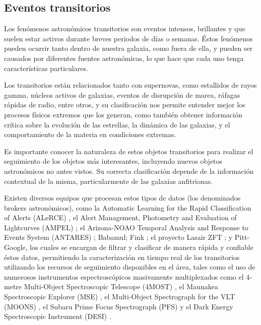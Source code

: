 \documentclass[../tesis.tex]{subfiles}
\begin{document}
\subsection{Eventos transitorios}

Los fenómenos astronómicos transitorios son eventos intensos, brillantes y que suelen estar activos durante breves periodos de días o semanas. Éstos fenómenos pueden ocurrir tanto dentro de nuestra galaxia, como fuera de ella, y pueden ser causados por diferentes fuentes astronómicas, lo que hace que cada uno tenga características particulares.\par\null\par 

Los transitorios están relacionados tanto con supernovas, como estallidos de rayos gamma, núcleos activos de galaxias, eventos de disrupción de marea, ráfagas rápidas de radio, entre otros, y su clasificación nos permite entender mejor los procesos físicos extremos que los generan, como también obtener información crítica sobre la evolución de las estrellas, la dinámica de las galaxias, y el comportamiento de la materia en condiciones extremas.\par\null\par

Es importante conocer la naturaleza de estos objetos transitorios para realizar el seguimiento de los objetos más interesantes, incluyendo nuevos objetos astronómicos no antes vistos. Su correcta clasificación depende de la información contextual de la misma, particularmente de las galaxias anfitrionas.\par\null\par

Existen diversos equipos que procesan estos tipos de datos (los denominados brokers astronómicos), como la Automatic Learning for the Rapid Classification of Alerts (ALeRCE) \cite{alerce}, el Alert Management, Photometry and Evaluation of Lightcurves (AMPEL) \cite{ampel}; el Arizona-NOAO Temporal Analysis and Response to Events System (ANTARES) \cite{antares}; Babamul; Fink \cite{fink}; el proyecto Lasair ZFT \cite{lasair}; y Pitt-Google, los cuales se encargan de filtrar y clasificar de manera rápida y confiable éstos datos, permitiendo la caracterización en tiempo real de los transitorios utilizando los recursos de seguimiento disponibles en el área, tales como el uso de numerosos instrumentos espectroscópicos masivamente multiplexados como el 4-metre Multi-Object Spectroscopic Telescope (4MOST) \cite{4most}, el Maunakea Spectroscopic Explorer (MSE) \cite{mse}, el Multi-Object Spectrograph for the VLT (MOONS) \cite{MOONS}, el Subaru Prime Focus Spectrograph (PFS) \cite{pfs} y el Dark Energy Spectroscopic Instrument (DESI) \cite{desi}.\par\null\par
\end{document}
